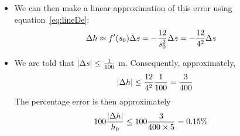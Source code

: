 \begin{eg}
\begin{itemize}
\item We can then make a linear approximation of this error using
equation~\eqref{eq:lineDe}:
\begin{align*}
\Delta h &\approx f'(s_0)\Delta s =-\frac{12}{s_0^2}\Delta s =-\frac{12}{4^2}\Delta s
\end{align*}
\item We are told that $|\Delta s|\le\frac{1}{100}$ m. Consequently, approximately,
\begin{align*}
 |\Delta h|\le \frac{12}{4^2}\frac{1}{100}=\frac{3}{400}
\end{align*}
The percentage error is then approximately
\begin{align*}
  100\frac{|\Delta h|}{h_0} & \le 100\frac{3}{400\times 5}=0.15\%
\end{align*}
\end{itemize}
\end{eg}

%
%

